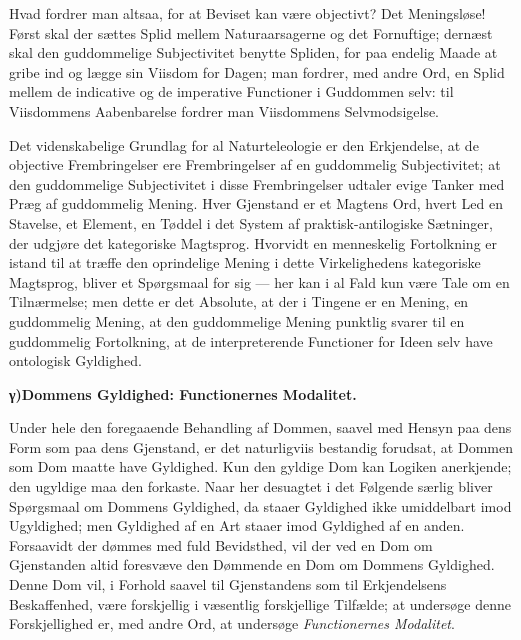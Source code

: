 \documentclass[12pt]{book}
\newcommand{\opage}[1]{\marginnote{\footnotesize\textit{[#1]}}}
\begin{document}
Hvad fordrer man altsaa, for at Beviset kan være objectivt?
Det Meningsløse! Først skal der sættes Splid
mellem Naturaarsagerne og det Fornuftige; dernæst skal den
guddommelige Subjectivitet benytte Spliden, for paa endelig
Maade at gribe ind og lægge sin Viisdom for Dagen; man
fordrer, med andre Ord, en Splid mellem de indicative og
de imperative Functioner i Guddommen selv: til Viisdommens
Aabenbarelse fordrer man Viisdommens Selvmodsigelse.

Det videnskabelige Grundlag for al Naturteleologie er
den Erkjendelse, at de objective Frembringelser ere Frembringelser
af en guddommelig Subjectivitet; at den guddommelige
Subjectivitet i disse Frembringelser udtaler evige Tanker
med Præg af guddommelig Mening. Hver Gjenstand er et
Magtens Ord, hvert Led en Stavelse, et Element, en Tøddel %
i det System af praktisk-antilogiske Sætninger, der udgjøre
det kategoriske Magtsprog. Hvorvidt en menneskelig Fortolkning
er istand til at træffe den oprindelige Mening i dette
Virkelighedens kategoriske Magtsprog, bliver et Spørgsmaal
for sig --- her kan i al Fald kun være Tale om en Tilnærmelse;
men dette er det Absolute, at der i Tingene er
en Mening, en guddommelig Mening, at den guddommelige
\opage{176}Mening punktlig svarer til en guddommelig Fortolkning, at
de interpreterende Functioner for Ideen selv have ontologisk
Gyldighed.

\begin{center}{\bfseries γ)\quad Dommens Gyldighed: Functionernes Modalitet.}\end{center}

Under hele den foregaaende Behandling af Dommen, saavel
med Hensyn paa dens Form som paa dens Gjenstand, er
det naturligviis bestandig forudsat, at Dommen som Dom
maatte have Gyldighed. Kun den gyldige Dom kan Logiken
anerkjende; den ugyldige maa den forkaste. Naar her desuagtet
i det Følgende særlig bliver Spørgsmaal om Dommens
Gyldighed, da staaer Gyldighed ikke umiddelbart imod Ugyldighed;
men Gyldighed af en Art staaer imod Gyldighed af
en anden. Forsaavidt der dømmes med fuld Bevidsthed, vil
der ved en Dom om Gjenstanden altid foresvæve den Dømmende
en Dom om Dommens Gyldighed. Denne Dom vil,
i Forhold saavel til Gjenstandens som til Erkjendelsens Beskaffenhed,
være forskjellig i væsentlig forskjellige Tilfælde; at
undersøge denne Forskjellighed er, med andre Ord, at undersøge
\emph{Functionernes Modalitet}.
\end{document}
